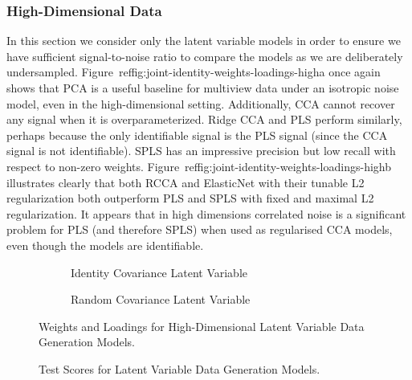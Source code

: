 \subsubsection{High-Dimensional Data}
In this section we consider only the latent variable models in order to ensure we have sufficient signal-to-noise ratio to compare the models as we are deliberately undersampled.
Figure~ref{fig:joint-identity-weights-loadings-high}a once again shows that PCA is a useful baseline for multiview data under an isotropic noise model, even in the high-dimensional setting.
Additionally, CCA cannot recover any signal when it is overparameterized.
Ridge CCA and PLS perform similarly, perhaps because the only identifiable signal is the PLS signal (since the CCA signal is not identifiable).
SPLS has an impressive precision but low recall with respect to non-zero weights.
Figure~ref{fig:joint-identity-weights-loadings-high}b illustrates clearly that both RCCA and ElasticNet with their tunable L2 regularization both outperform PLS and SPLS with fixed and maximal L2 regularization.
It appears that in high dimensions correlated noise is a significant problem for PLS (and therefore SPLS) when used as regularised CCA models, even though the models are identifiable.

\begin{figure}
\centering
\begin{subfigure}{0.49\linewidth}
\centering

\caption{Identity Covariance Latent Variable}
\end{subfigure}
%
\begin{subfigure}{0.49\linewidth}
\centering

\caption{Random Covariance Latent Variable}
\end{subfigure}
\caption{Weights and Loadings for High-Dimensional Latent Variable Data Generation Models.}\label{fig:latent-variable-weights-loadings-high}
\end{figure}

\begin{figure}
\centering
\begin{subfigure}{0.49\linewidth}
\centering

\caption{}
\end{subfigure}
%
\begin{subfigure}{0.49\linewidth}
\centering

\caption{}
\end{subfigure}
\caption{Test Scores for Latent Variable Data Generation Models.}\label{fig:latent-variable-scores-high}
\end{figure}

